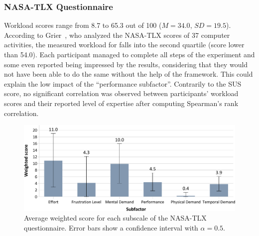 \subsubsection{NASA-TLX Questionnaire}
Workload scores range from 8.7 to 65.3 out of 100 ($M{=}34.0$, $SD{=}19.5$). According to Grier~\cite{Grier:2015}, who analyzed the NASA-TLX scores of 37 computer activities, the measured workload for \ql falls into the second quartile (score lower than 54.0). Each participant managed to complete all steps of the experiment and some even reported being impressed by the results, considering that they would not have been able to do the same without the help of the framework. This could explain the low impact of the ``performance subfactor''. 
 Contrarily to the SUS score, no significant correlation was observed between participants' workload scores and their reported level of expertise after computing Spearman's rank correlation.

\begin{figure}[t]
    \centering
    \vspace{4pt}
    \includegraphics[width=\linewidth]{Figures/QuantumLeap/Evaluation/NASA-TLX-scores.pdf}
    \caption{Average weighted score for each subscale of the NASA-TLX questionnaire. Error bars show a confidence interval with $\alpha{=}0.5$.}
    \label{fig:quantumleap:nasa-tlx-scores}
\end{figure}

